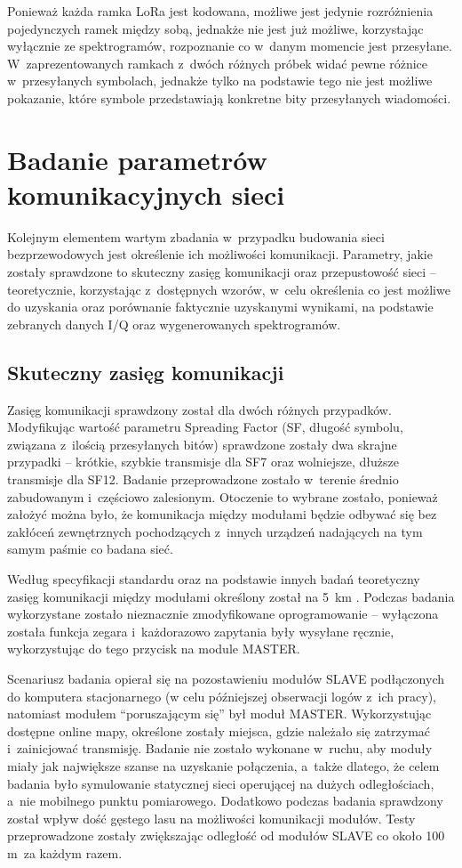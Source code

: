 Ponieważ każda ramka LoRa jest kodowana, możliwe jest jedynie rozróżnienia pojedynczych ramek między sobą, jednakże nie
jest już możliwe, korzystając wyłącznie ze spektrogramów, rozpoznanie co w~danym momencie jest przesyłane.
W~zaprezentowanych ramkach z~dwóch różnych próbek widać pewne różnice w~przesyłanych symbolach, jednakże tylko na
podstawie tego nie jest możliwe pokazanie, które symbole przedstawiają konkretne bity przesyłanych wiadomości.

\FloatBarrier

\section{\label{sect:network-communication-params}Badanie parametrów komunikacyjnych sieci} Kolejnym elementem wartym
zbadania w~przypadku budowania sieci bezprzewodowych jest określenie ich możliwości komunikacji. Parametry, jakie
zostały sprawdzone to skuteczny zasięg komunikacji oraz przepustowość sieci -- teoretycznie, korzystając z~dostępnych
wzorów, w~celu określenia co jest możliwe do uzyskania oraz porównanie faktycznie uzyskanymi wynikami, na podstawie
zebranych danych I/Q oraz wygenerowanych spektrogramów.

\subsection{\label{sect:network-communication-range}Skuteczny zasięg komunikacji} Zasięg komunikacji sprawdzony został
dla dwóch różnych przypadków. Modyfikując wartość parametru Spreading Factor (SF, długość symbolu, związana z~ilością
przesyłanych bitów) sprawdzone zostały dwa skrajne przypadki -- krótkie, szybkie transmisje dla SF7 oraz wolniejsze,
dłuższe transmisje dla SF12. Badanie przeprowadzone zostało w~terenie średnio zabudowanym i~częściowo zalesionym.
Otoczenie to wybrane zostało, ponieważ założyć można było, że komunikacja między modułami będzie odbywać się bez
zakłóceń zewnętrznych pochodzących z~innych urządzeń nadających na tym samym paśmie co badana sieć.

Według specyfikacji standardu oraz na podstawie innych badań teoretyczny zasięg komunikacji między modułami określony
został na 5~km \cite{lora-phy-range-test}. Podczas badania wykorzystane zostało nieznacznie zmodyfikowane oprogramowanie
-- wyłączona została funkcja zegara i~każdorazowo zapytania były wysyłane ręcznie, wykorzystując do tego przycisk na
module MASTER.

Scenariusz badania opierał się na pozostawieniu modułów SLAVE podłączonych do komputera stacjonarnego (w celu
późniejszej obserwacji logów z~ich pracy), natomiast modułem \enquote{poruszającym się} był moduł MASTER. Wykorzystując
dostępne online mapy, określone zostały miejsca, gdzie należało się zatrzymać i~zainicjować transmisję. Badanie nie
zostało wykonane w~ruchu, aby moduły miały jak największe szanse na uzyskanie połączenia, a~także dlatego, że celem
badania było symulowanie statycznej sieci operującej na dużych odległościach, a~nie mobilnego punktu pomiarowego.
Dodatkowo podczas badania sprawdzony został wpływ dość gęstego lasu na możliwości komunikacji modułów. Testy
przeprowadzone zostały zwiększając odległość od modułów SLAVE co około 100 m~za każdym razem.

